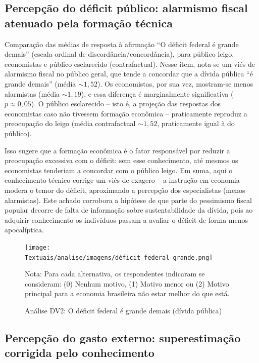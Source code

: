 \subsection{Percepção do déficit público: alarmismo fiscal atenuado pela formação técnica}

Comparação das médias de resposta à afirmação “O déficit federal é grande demais” (escala ordinal de discordância/concordância), para público leigo, economistas e público esclarecido (contrafactual). Nesse item, nota-se um viés de alarmismo fiscal no público geral, que tende a concordar que a dívida pública “é grande demais” (média $\sim 1{,}52$). Os economistas, por sua vez, mostram-se menos alarmistas (média $\sim 1{,}19$), e essa diferença é marginalmente significativa ($p \approx 0{,}05$). O público esclarecido – isto é, a projeção das respostas dos economistas caso não tivessem formação econômica – praticamente reproduz a preocupação do leigo (média contrafactual $\sim 1{,}52$, praticamente igual à do público). 

Isso sugere que a formação econômica é o fator responsável por reduzir a preocupação excessiva com o déficit: sem esse conhecimento, até mesmos os economistas tenderiam a concordar com o público leigo. Em suma, aqui o conhecimento técnico corrige um viés de exagero – a instrução em economia modera o temor do déficit, aproximando a percepção dos especialistas (menos alarmistas). Este achado corrobora a hipótese de que parte do pessimismo fiscal popular decorre de falta de informação sobre sustentabilidade da dívida, pois ao adquirir conhecimento os indivíduos passam a avaliar o déficit de forma menos apocalíptica.


\begin{figure}[htbp]
    \centering
    \texttt{[image: Textuais/analise/imagens/déficit\_federal\_grande.png]}
    \caption{Análise DV2: O déficit federal é grande demais (dívida pública)}
    \smallskip
    Nota: Para cada alternativa, os respondentes indicaram se consideram: (0) Nenhum motivo, (1) Motivo menor ou (2) Motivo principal para a economia brasileira não estar melhor do que está.
    \label{fig:deficit_federal_grande}
\end{figure}

\subsection{Percepção do gasto externo: superestimação corrigida pelo conhecimento}

